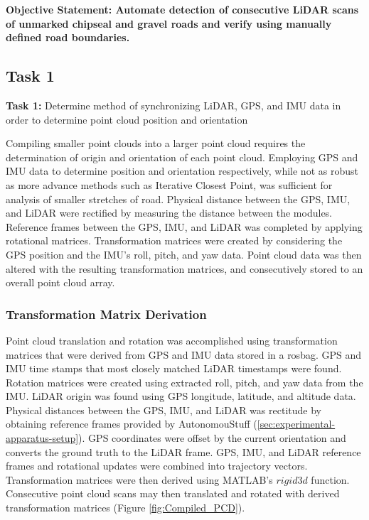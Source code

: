 \documentclass[numbered,pdftex]{ohio-etd}
\begin{document}
{		{
		
		\textbf{Objective Statement: Automate detection of consecutive LiDAR scans of unmarked chipseal and gravel roads and verify using manually defined road boundaries.}
		
		\subsection{Task 1}{
		
			\textbf{Task 1: }{Determine method of synchronizing LiDAR, GPS, and IMU data in order to determine point cloud position and orientation}
		
				{Compiling smaller point clouds into a larger point cloud requires the determination of origin and orientation of each point cloud. Employing GPS and IMU data to determine position and orientation respectively, while not as robust as more advance methods such as Iterative Closest Point, was sufficient for analysis of smaller stretches of road. Physical distance between the GPS, IMU, and LiDAR were rectified by measuring the distance between the modules. Reference frames between the GPS, IMU, and LiDAR was completed by applying rotational matrices. Transformation matrices were created by considering the GPS position and the IMU's roll, pitch, and yaw data. Point cloud data was then altered with the resulting transformation matrices, and consecutively stored to an overall point cloud array.}
			
			\subsubsection{Transformation Matrix Derivation} \label{sec:grab_tform} {
			
				{Point cloud translation and rotation was accomplished using transformation matrices that were derived from GPS and IMU data stored in a rosbag. GPS and IMU  time stamps that most closely matched LiDAR timestamps were found. Rotation matrices were created using extracted roll, pitch, and yaw data from the IMU. LiDAR origin was found using GPS longitude, latitude, and altitude data. Physical distances between the GPS, IMU, and LiDAR was rectitude by obtaining reference frames provided by AutonomouStuff (\ref{sec:experimental-apparatus-setup}). GPS coordinates were offset by the current orientation and converts the ground truth to the LiDAR frame. GPS, IMU, and LiDAR reference frames and rotational updates were combined into trajectory vectors. Transformation matrices were then derived using MATLAB's $rigid3d$ function. Consecutive point cloud scans may then translated and rotated with derived transformation matrices (Figure \ref{fig:Compiled_PCD}).}
				
}}}}
\end{document}
